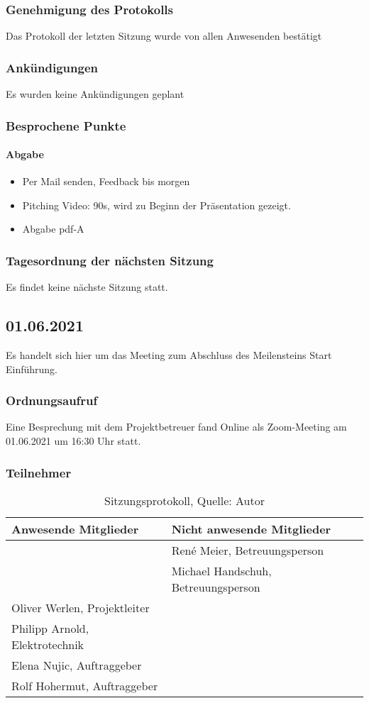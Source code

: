 \subsubsection{Genehmigung des Protokolls}
Das Protokoll der letzten Sitzung wurde von allen Anwesenden bestätigt
\subsubsection{Ankündigungen}
Es wurden keine Ankündigungen geplant
\subsubsection{Besprochene Punkte}
\paragraph{Abgabe}
\begin{itemize}
	\item Per Mail senden, Feedback bis morgen
	\item Pitching Video: 90s, wird zu Beginn der Präsentation gezeigt. 
	\item Abgabe pdf-A
\end{itemize}
\subsubsection{Tagesordnung der nächsten Sitzung}
Es findet keine nächste Sitzung statt. 
\newpage

\subsection{01.06.2021}
Es handelt sich hier um das Meeting zum Abschluss des Meilensteins Start Einführung. 
\subsubsection{Ordnungsaufruf}
Eine Besprechung mit dem Projektbetreuer fand Online als Zoom-Meeting am 01.06.2021 um 16:30 Uhr statt.
\subsubsection{Teilnehmer}
\begin{table}[H]
	\setlength\extrarowheight{2pt} %
	\begin{tabularx}{\textwidth}{|X|X|}
		\hline
		\textbf{Anwesende Mitglieder} &  \textbf{Nicht anwesende Mitglieder} \\
		\hline
		& René Meier, Betreuungsperson  \\
		&Michael Handschuh, Betreuungsperson   \\
		Oliver Werlen, Projektleiter &  \\
		Philipp Arnold, Elektrotechnik & \\
		Elena Nujic, Auftraggeber & \\
		Rolf Hohermut, Auftraggeber  &\\
		\hline
	\end{tabularx}
	\caption{ \label{tbl: Teilnehmerliste vom 01.06.2021}Sitzungsprotokoll, Quelle: Autor}
\end{table}
